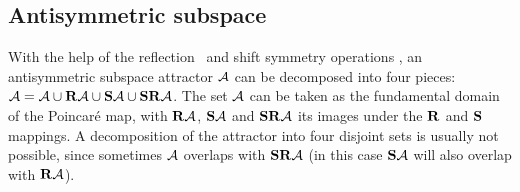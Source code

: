 \subsection{Antisymmetric subspace}
\label{s:AntisymmSubsp}

With the help of the
reflection \Refl\ and shift symmetry {\Shift}
operations
,
an antisymmetric subspace
attractor ${\cal A}$ can be decomposed into four pieces:
 ${\cal A}={\cal A} \cup \Refl {\cal A}  \cup \Shift {\cal A}
  \cup \Shift \Refl {\cal A} $.
The set $ {\cal A}$ can be taken as
the fundamental
domain of the Poincar{\'e} map, with $\Refl  {\cal A} $,
$\Shift  {\cal A} $ and $\Shift \Refl  {\cal A} $ its images under the
$\mathbf{R}$ and $\mathbf{S}$ mappings.
A decomposition
of the attractor into four disjoint sets
is usually not possible, since sometimes $ {\cal A}$ overlaps with
$\Shift \Refl{\cal A} $ (in this case $\Shift  {\cal A}$ will also  overlap with
$\Refl {\cal A} $).



